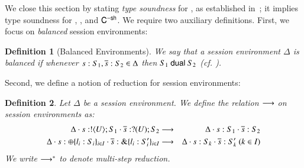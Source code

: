 \documentclass[preprint,11pt]{elsarticle}
\newtheorem{definition}{Definition}[section]
\begin{document}
{%

We close this section  by stating  \emph{type soundness} for \HOp, as established in~\cite{KouzapasPY17}; it implies 
type soundness for \HO, \sessp, and $\mathsf{C}^{-\mathsf{sh}}$. 
We require two auxiliary definitions. First, 
we focus on \emph{balanced} session environments: 


\begin{definition}[Balanced Environments]\label{d:wtenv}%
	We say that a session environment $\Delta$ is {\em balanced} if whenever
	$s: S_1, \overline{s}: S_2 \in \Delta$ then $S_1 \ \mathsf{dual}\  S_2$ (cf. ).
\end{definition}

Second, we define a notion of reduction for session environments:

\begin{definition}%
	\label{def:ses_red}
	Let $\Delta$ be a session environment.
	We define the relation $\longrightarrow$ on session environments as:
	\begin{eqnarray*}
			\Delta \cat s: \btout{U} S_1 \cat \dual{s}: \btinp{U} S_2 & \red &
			\Delta \cat s: S_1 \cat \dual{s}: S_2\\%
			\Delta \cat s: \btsel{l_i: S_i}_{i \in I} \cat \dual{s}: \btbra{l_i: S_i'}_{i \in I} &\red& 
			 \Delta \cat s: S_k \cat \dual{s}: S_k' \ (k \in I)
		\end{eqnarray*}
We write $\longrightarrow^\ast$ to denote multi-step reduction.
\end{definition}

}
\end{document}
